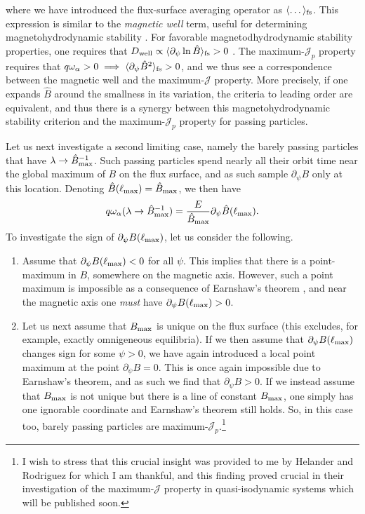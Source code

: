 where we have introduced the flux-surface averaging operator as $\langle \dots \rangle_{\rm fs}$. This expression is similar to the \textit{magnetic well} term, useful for determining magnetohydrodynamic stability \cite{greene1997brief,landreman2020magnetic,rodriguez2023magnetohydrodynamic}. For favorable magnetodhydrodynamic stability properties, one requires that $D_{\rm well} \propto \langle \partial_\psi \ln \hat{B} \rangle_{\rm fs} > 0$ \cite{helander2014theory}. The maximum-$\mathcal{J}_p$ property requires that $q \omega_\alpha >0 \implies \langle \partial_\psi \hat{B}^2 \rangle_{\rm fs} > 0$, and we thus see a correspondence between the magnetic well and the maximum-$\mathcal{J}$ property. More precisely, if one expands $\hat{B}$ around the smallness in its variation, the criteria to leading order are equivalent, and thus there is a synergy between this magnetohydrodynamic stability criterion and the maximum-$\mathcal{J}_p$ property for passing particles. \par 
Let us next investigate a second limiting case, namely the barely passing particles that have $\lambda \rightarrow \hat{B}_{\rm  max}^{-1}$. Such passing particles spend nearly all their orbit time near the global maximum of $B$ on the flux surface, and as such sample $\partial_\psi B$ only at this location. Denoting $\hat{B}(\ell_{\rm max}) = \hat{B}_{\rm max}$, we then have
\begin{equation}
    q \omega_\alpha (\lambda \rightarrow \hat{B}_{\rm  max}^{-1}) = \frac{E}{\hat{B}_{\rm max}} \partial_\psi \hat{B}(\ell_{\rm max}).
\end{equation}
To investigate the sign of $\partial_\psi B(\ell_{\rm max})$, let us consider the following. 
\begin{enumerate}
    \item Assume that $\partial_\psi B(\ell_{\rm max}) < 0 $ for all $\psi$. This implies that there is a point-maximum in $B$, somewhere on the magnetic axis. However, such a point maximum is impossible as a consequence of Earnshaw's theorem \cite{earnshaw1848nature}, and near the magnetic axis one {\it must} have $\partial_\psi B(\ell_{\rm max}) > 0$.
    \item Let us next assume that $B_{\rm max}$ is unique on the flux surface (this excludes, for example, exactly omnigeneous equilibria). If we then assume that $\partial_\psi B(\ell_{\rm max})$ changes sign for some $\psi > 0$, we have again introduced a local point maximum at the point $\partial_\psi B = 0$. This is once again impossible due to Earnshaw's theorem, and as such we find that $\partial_\psi B > 0 $. If we instead assume that $B_{\rm max}$ is not unique but there is a line of constant $B_{\rm max}$, one simply has one ignorable coordinate and Earnshaw's theorem still holds. So, in this case too, barely passing particles are maximum-$\mathcal{J}_p$.\footnote{I wish to stress that this crucial insight was provided to me by Helander and Rodriguez for which I am thankful, and this finding proved crucial in their investigation of the maximum-$\mathcal{J}$ property in quasi-isodynamic systems which will be published soon.}
\end{enumerate}
